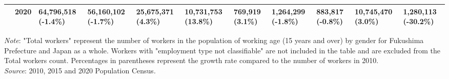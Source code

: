 \documentclass[serif, aspectratio=169]{beamer}
\begin{document}
\begin{frame}[label=workers_number]
\begin{table}[htbp]
{\begin{tabular}{lllllllllll}
 & 2020 & 64,796,518 (-1.4\%) & 56,160,102 (-1.7\%) & \multicolumn{1}{l}{25,675,371 (4.3\%)} & \multicolumn{1}{l}{10,731,753 (13.8\%)} & \multicolumn{1}{l}{769,919 (3.1\%)} & \multicolumn{1}{l}{1,264,299 (-1.8\%)} & \multicolumn{1}{l}{883,817 (-0.8\%)} & \multicolumn{1}{l}{10,745,470 (3.0\%)} & \multicolumn{1}{l}{1,280,113 (-30.2\%)} \\
\hline
\end{tabular}%
}
\addlinespace[0.12em]
\raggedright
\scriptsize
\textit{Note}: "Total workers" represent the number of workers in the population of working age (15 years and over) by gender for Fukushima Prefecture and Japan as a whole. Workers with "employment type not classifiable" are not included in the table and are excluded from the Total workers count. Percentages in parentheses represent the growth rate compared to the number of workers in 2010.\\
\textit{Source}: 2010, 2015 and 2020 Population Census.\\
\label{table:Number_of_workers}
\end{table}

\end{frame}

\end{document}
